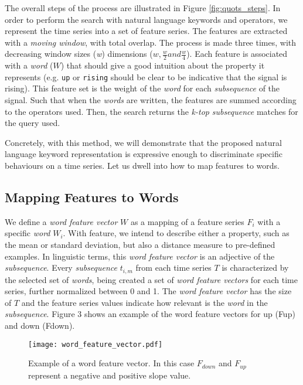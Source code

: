 The overall steps of the process are illustrated in Figure \ref{fig:quots_steps}. In order to perform the search with natural language keywords and operators, we represent the time series into a set of feature series. The features are extracted with a \textit{moving window}, with total overlap. The process is made three times, with decreasing window sizes (\textit{w}) dimensions ($w, \frac{w}{2} and \frac{w}{4}$). Each feature is associated with a \textit{word} ($W$) that should give a good intuition about the property it represents (e.g. \texttt{up} or \texttt{rising} should be clear to be indicative that the signal is rising). This feature set is the weight of the \textit{word} for each \textit{subsequence} of the signal. Such that when the \textit{words} are written, the features are summed according to the operators used. Then, the search returns the \textit{k-top} \textit{subsequence} matches for the query used.
\par
Concretely, with this method, we will demonstrate that the proposed natural language keyword representation is expressive enough to discriminate specific behaviours on a time series. Let us dwell into how to map features to words.

\subsection{Mapping Features to Words}

We define a \textit{word feature vector} $W$ as a mapping of a feature series $F_i$ with a specific \textit{word} $W_i$. With feature, we intend to describe either a property, such as the mean or standard deviation, but also a distance measure to pre-defined examples. In linguistic terms, this \textit{word feature vector} is an adjective of the \textit{subsequence}. Every \textit{subsequence} $t_{i,m}$ from each time series $T$ is characterized by the selected set of \textit{words},  being created a set of \textit{word feature vectors} for each time series, further normalized between 0 and 1. The \textit{word feature vector} has the size of $T$ and the feature series values indicate how relevant is the \textit{word} in the \textit{subsequence}. Figure 3 shows an example of the word feature vectors for \textcolor{myblue4}{up (Fup)} and \textcolor{myblue3}{down (Fdown)}.

\begin{figure}[!h]
\centering
\texttt{[image: word\_feature\_vector.pdf]}
\caption{Example of a word feature vector. In this case $F_{down}$ and $F_{up}$ represent a negative and positive slope value.}
\label{fig:wfv_example}
\end{figure}

